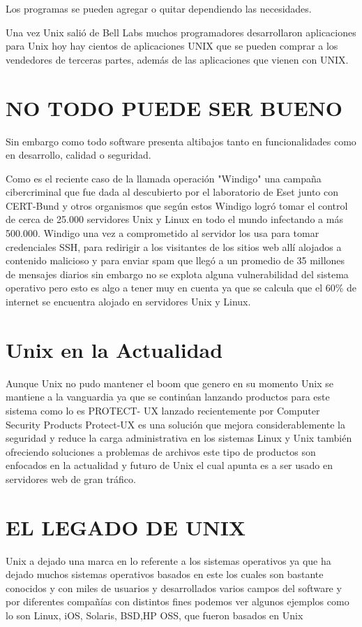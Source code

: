 Los programas se pueden agregar o quitar dependiendo las necesidades.

Una vez Unix salió de Bell Labs muchos programadores desarrollaron aplicaciones para Unix hoy hay cientos de aplicaciones UNIX que se pueden comprar a los vendedores de 
terceras partes, además de las aplicaciones que vienen con UNIX.


\section*{NO TODO PUEDE SER BUENO}
Sin embargo como todo software presenta altibajos tanto en funcionalidades como en desarrollo, calidad o seguridad.
                                           
Como es el reciente caso de la llamada operación "Windigo" una campaña cibercriminal que fue dada al descubierto por el laboratorio de Eset junto con CERT-Bund y otros 
organismos que según estos Windigo logró tomar el control de cerca de 25.000 servidores Unix y Linux en todo el mundo infectando a más 500.000. Windigo una vez a 
comprometido al servidor los usa para tomar credenciales SSH, para redirigir a  los visitantes de los sitios web allí alojados a contenido malicioso  y para enviar spam que 
llegó a un promedio de 35 millones de mensajes diarios sin embargo no se explota alguna vulnerabilidad del sistema operativo pero esto es algo a tener muy en cuenta ya que 
se calcula que el 60\% de internet se encuentra alojado en servidores Unix y Linux.

\section*{Unix en la Actualidad}
Aunque Unix no pudo mantener el boom que genero en su momento Unix se mantiene a la vanguardia ya que se continúan lanzando productos para este sistema  como lo es PROTECT-
UX lanzado recientemente por  Computer Security Products Protect-UX es una solución que mejora considerablemente la seguridad y reduce la carga administrativa en los 
sistemas Linux y Unix también ofreciendo soluciones a problemas de archivos este tipo de productos son enfocados en la actualidad y futuro de Unix el cual apunta es a ser  
usado en servidores web de gran tráfico.

\section*{EL LEGADO DE UNIX}
Unix  a dejado una marca en lo referente a los sistemas operativos ya que ha dejado  muchos sistemas operativos basados en este los cuales son bastante conocidos y con 
miles de usuarios y desarrollados varios campos del software y por diferentes compañías con distintos fines  podemos ver algunos ejemplos como lo son Linux, iOS, Solaris, 
BSD,HP OSS, que fueron basados en Unix


 